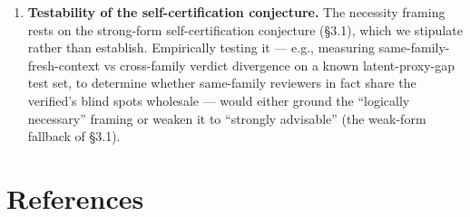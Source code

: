 \documentclass[
  11pt,
]{article}
\begin{document}
\begin{enumerate}
  spec-gaming), oracle disagreement (two heterogeneous oracles returning
  conflicting verdicts), and error cascades (a wrong verdict triggering
  unnecessary rollback). The threshold at which oracle error outweighs
  defense value --- and how a false-positive rate interacts with the
  partial decoupling of §8.2 --- is open.
\item
  \textbf{Testability of the self-certification conjecture.} The
  necessity framing rests on the strong-form self-certification
  conjecture (§3.1), which we stipulate rather than establish.
  Empirically testing it --- e.g., measuring same-family-fresh-context
  vs cross-family verdict divergence on a known latent-proxy-gap test
  set, to determine whether same-family reviewers in fact share the
  verified's blind spots wholesale --- would either ground the
  ``logically necessary'' framing or weaken it to ``strongly advisable''
  (the weak-form fallback of §3.1).
\end{enumerate}

\section{References}\label{references}
\end{document}
